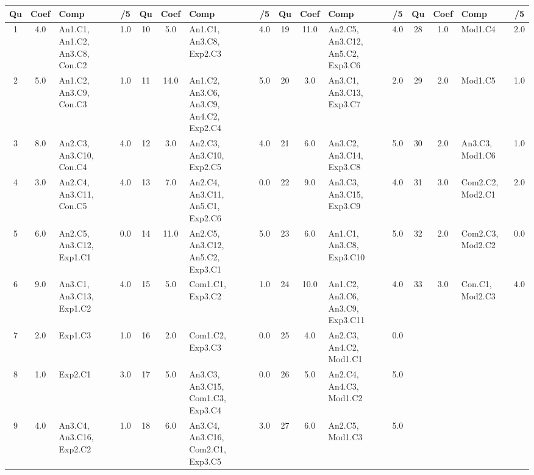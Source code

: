 \begin{center} 
\begin{tabular}{|c|c|m{1cm}|c||c|c|m{1cm}|c||c|c|m{1cm}|c||c|c|m{1cm}|c|} 
\hline \textbf{Qu} & \textbf{Coef} & \textbf{Comp} & \textbf{/5} & \textbf{Qu} & \textbf{Coef} & \textbf{Comp} & \textbf{/5} & \textbf{Qu} & \textbf{Coef} & \textbf{Comp} & \textbf{/5} & \textbf{Qu} & \textbf{Coef} & \textbf{Comp} & \textbf{/5} \\ 
\hline 
\hline 
1 & 4.0 & An1.C1, An1.C2, An3.C8, Con.C2 & 1.0 & 10 & 5.0 & An1.C1, An3.C8, Exp2.C3 & 4.0 & 19 & 11.0 & An2.C5, An3.C12, An5.C2, Exp3.C6 & 4.0 & 28 & 1.0 & Mod1.C4 & 2.0 \\ \hline 
2 & 5.0 & An1.C2, An3.C9, Con.C3 & 1.0 & 11 & 14.0 & An1.C2, An3.C6, An3.C9, An4.C2, Exp2.C4 & 5.0 & 20 & 3.0 & An3.C1, An3.C13, Exp3.C7 & 2.0 & 29 & 2.0 & Mod1.C5 & 1.0 \\ \hline 
3 & 8.0 & An2.C3, An3.C10, Con.C4 & 4.0 & 12 & 3.0 & An2.C3, An3.C10, Exp2.C5 & 4.0 & 21 & 6.0 & An3.C2, An3.C14, Exp3.C8 & 5.0 & 30 & 2.0 & An3.C3, Mod1.C6 & 1.0 \\ \hline 
4 & 3.0 & An2.C4, An3.C11, Con.C5 & 4.0 & 13 & 7.0 & An2.C4, An3.C11, An5.C1, Exp2.C6 & 0.0 & 22 & 9.0 & An3.C3, An3.C15, Exp3.C9 & 4.0 & 31 & 3.0 & Com2.C2, Mod2.C1 & 2.0 \\ \hline 
5 & 6.0 & An2.C5, An3.C12, Exp1.C1 & 0.0 & 14 & 11.0 & An2.C5, An3.C12, An5.C2, Exp3.C1 & 5.0 & 23 & 6.0 & An1.C1, An3.C8, Exp3.C10 & 5.0 & 32 & 2.0 & Com2.C3, Mod2.C2 & 0.0 \\ \hline 
6 & 9.0 & An3.C1, An3.C13, Exp1.C2 & 4.0 & 15 & 5.0 & Com1.C1, Exp3.C2 & 1.0 & 24 & 10.0 & An1.C2, An3.C6, An3.C9, Exp3.C11 & 4.0 & 33 & 3.0 & Con.C1, Mod2.C3 & 4.0 \\ \hline 
7 & 2.0 & Exp1.C3 & 1.0 & 16 & 2.0 & Com1.C2, Exp3.C3 & 0.0 & 25 & 4.0 & An2.C3, An4.C2, Mod1.C1 & 0.0 &  &  &  &  \\ \hline 

8 & 1.0 & Exp2.C1 & 3.0 & 17 & 5.0 & An3.C3, An3.C15, Com1.C3, Exp3.C4 & 0.0 & 26 & 5.0 & An2.C4, An4.C3, Mod1.C2 & 5.0 &  &  &  &  \\ \hline 

9 & 4.0 & An3.C4, An3.C16, Exp2.C2 & 1.0 & 18 & 6.0 & An3.C4, An3.C16, Com2.C1, Exp3.C5 & 3.0 & 27 & 6.0 & An2.C5, Mod1.C3 & 5.0 &  &  &  &  \\ \hline 

\end{tabular} 
\end{center} 
\normalsize 
 
